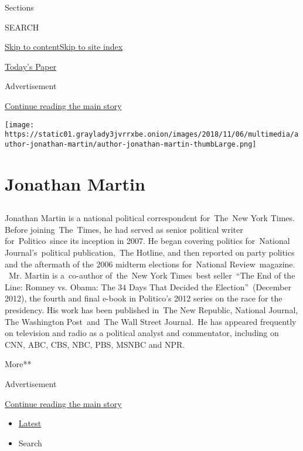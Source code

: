 Sections

SEARCH

\protect\hyperlink{site-content}{Skip to
content}\protect\hyperlink{site-index}{Skip to site index}

\href{https://myaccount.nytimes3xbfgragh.onion/auth/login?response_type=cookie\&client_id=vi}{}

\href{https://www.nytimes3xbfgragh.onion/section/todayspaper}{Today's
Paper}

Advertisement

\protect\hyperlink{after-top}{Continue reading the main story}

\texttt{[image: https://static01.graylady3jvrrxbe.onion/images/2018/11/06/multimedia/author-jonathan-martin/author-jonathan-martin-thumbLarge.png]}

\hypertarget{jonathan-martin}{%
\section{Jonathan Martin}\label{jonathan-martin}}

\hypertarget{section}{%
\subsection{}\label{section}}

Jonathan Martin is a national political correspondent for~The~New York
Times. Before joining~The~Times, he had served as senior political
writer for~Politico~since its inception in 2007. He began covering
politics for~National Journal's~political publication,~The Hotline, and
then reported on party politics and the aftermath of the 2006 midterm
elections for~National Review~magazine. ~Mr. Martin is a~co-author
of~the~New York Times~best seller~``The End of the Line: Romney vs.
Obama: The 34 Days That Decided the Election''~(December 2012), the
fourth and final e-book in Politico's 2012 series on the race for the
presidency. His work has been published in~The New Republic, National
Journal, The Washington Post~and~The Wall Street Journal.~He has
appeared frequently on television and radio as a political analyst and
commentator, including on CNN, ABC, CBS, NBC, PBS, MSNBC and NPR.

More**

Advertisement

\protect\hyperlink{after-mid1}{Continue reading the main story}

\begin{itemize}
\tightlist
\item
  \protect\hyperlink{stream-panel}{Latest}
\item
  Search
\end{itemize}

